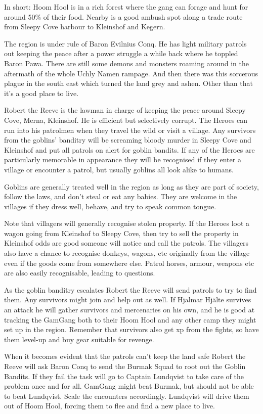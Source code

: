 In short: Hoom Hool is in a rich forest where the gang can forage and hunt for around 50\% of their food. Nearby is a good ambush spot along a trade route from Sleepy Cove harbour to Kleinshof and Kegern.

The region is under rule of Baron Evilnius Conq. He has light military patrols out keeping the peace after a power struggle a while back where he toppled Baron Pawa. There are still some demons and monsters roaming around in the aftermath of the whole Uchly Namen rampage. And then there was this sorcerous plague in the south east which turned the land grey and ashen. Other than that it's a good place to live.

Robert the Reeve is the lawman in charge of keeping the peace around Sleepy Cove, Merna, Kleinshof. He is efficient but selectively corrupt. The Heroes can run into his patrolmen when they travel the wild or visit a village. Any survivors from the goblins' banditry will be screaming bloody murder in Sleepy Cove and Kleinshof and put all patrols on alert for goblin bandits. If any of the Heroes are particularly memorable in appearance they will be recognised if they enter a village or encounter a patrol, but usually goblins all look alike to humans.

Goblins are generally treated well in the region as long as they are part of society, follow the laws, and don't steal or eat any babies. They are welcome in the villages if they dress well, behave, and try to speak common tongue.

Note that villagers will generally recognise stolen property. If the Heroes loot a wagon going from Kleinshof to Sleepy Cove, then try to sell the property in Kleinshof odds are good someone will notice and call the patrols. The villagers also have a chance to recognise donkeys, wagons, etc originally from the village even if the goods come from somewhere else. Patrol horses, armour, weapons etc are also easily recognisable, leading to questions.

As the goblin banditry escalates Robert the Reeve will send patrols to try to find them. Any survivors might join and help out as well. If Hjalmar Hjälte survives an attack he will gather survivors and mercenaries on his own, and he is good at tracking the GamGang both to their Hoom Hool and any other camp they might set up in the region. Remember that survivors also get xp from the fights, so have them level-up and buy gear suitable for revenge.

When it becomes evident that the patrols can't keep the land safe Robert the Reeve will ask Baron Conq to send the Burmak Squad to root out the Goblin Bandits. If they fail the task will go to Captain Lundqvist to take care of the problem once and for all. GamGang might beat Burmak, but should not be able to beat Lundqvist. Scale the encounters accordingly. Lundqvist will drive them out of Hoom Hool, forcing them to flee and find a new place to live.

